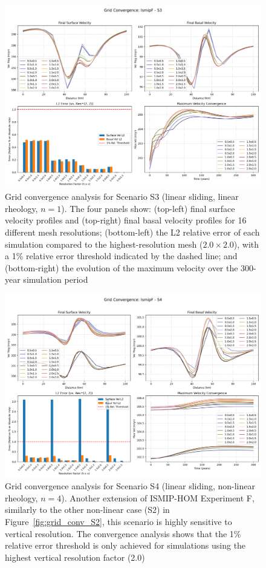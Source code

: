\begin{figure}[H]
    \includegraphics[scale=0.40]{figures/IsmipF_S3_convergence_summary.png}
    \caption{Grid convergence analysis for Scenario S3 (linear sliding, linear rheology, $n=1$). The four panels show: (top-left) final surface velocity profiles and (top-right) final basal velocity profiles for 16 different mesh resolutions; (bottom-left) the L2 relative error of each simulation compared to the highest-resolution mesh ($2.0\times2.0$), with a 1\% relative error threshold indicated by the dashed line; and (bottom-right) the evolution of the maximum velocity over the 300-year simulation period}
    \label{fig:grid_conv_S3}
\end{figure}
\begin{figure}[H]
    \includegraphics[scale=0.40]{figures/IsmipF_S4_convergence_summary.png}
    \caption{Grid convergence analysis for Scenario S4 (linear sliding, non-linear rheology, $n=4$). Another extension of ISMIP-HOM Experiment F, similarly to the other non-linear case (S2) in Figure~\ref{fig:grid_conv_S2}, this scenario is highly sensitive to vertical resolution. The convergence analysis shows that the 1\% relative error threshold is only achieved for simulations using the highest vertical resolution factor (2.0)}
    \label{fig:grid_conv_S4}
\end{figure}
